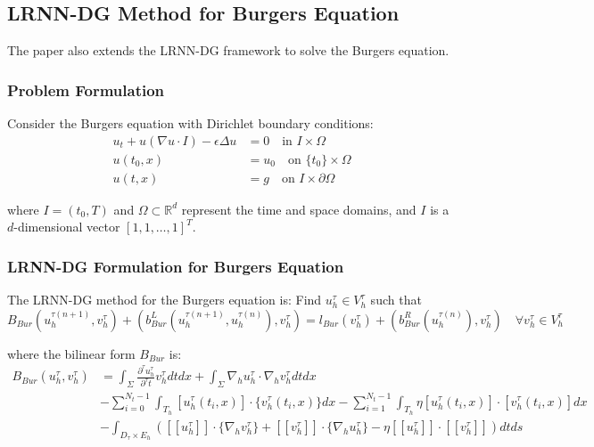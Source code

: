 \documentclass[11pt,a4paper]{article}
\begin{document}
\subsection{LRNN-DG Method for Burgers Equation}

The paper also extends the LRNN-DG framework to solve the Burgers equation.

\subsubsection{Problem Formulation}

Consider the Burgers equation with Dirichlet boundary conditions:
\begin{align}
u_t + u(\nabla u \cdot I) - \epsilon \Delta u &= 0 \quad \text{in } I \times \Omega \\
u(t_0, x) &= u_0 \quad \text{on } \{t_0\} \times \Omega \\
u(t, x) &= g \quad \text{on } I \times \partial\Omega
\end{align}

where $I = (t_0, T)$ and $\Omega \subset \mathbb{R}^d$ represent the time and space domains, and $I$ is a $d$-dimensional vector $[1,1,\ldots,1]^T$.

\subsubsection{LRNN-DG Formulation for Burgers Equation}

The LRNN-DG method for the Burgers equation is: Find $u_h^\tau \in V_h^\tau$ such that
\begin{equation}
B_{Bur}(u_h^{\tau(n+1)}, v_h^\tau) + \left(b_{Bur}^L(u_h^{\tau(n+1)}, u_h^{\tau(n)}), v_h^\tau\right) = l_{Bur}(v_h^\tau) + \left(b_{Bur}^R(u_h^{\tau(n)}), v_h^\tau\right) \quad \forall v_h^\tau \in V_h^\tau
\end{equation}

where the bilinear form $B_{Bur}$ is:
\begin{align}
B_{Bur}(u_h^\tau, v_h^\tau) &= \int_\Sigma \frac{\partial^\tau u_h^\tau}{\partial^\tau t} v_h^\tau dtdx + \int_\Sigma \nabla_h u_h^\tau \cdot \nabla_h v_h^\tau dtdx \\
&- \sum_{i=0}^{N_t-1} \int_{T_h} [u_h^\tau(t_i, x)] \cdot \{v_h^\tau(t_i, x)\} dx - \sum_{i=1}^{N_t-1} \int_{T_h} \eta [u_h^\tau(t_i, x)] \cdot [v_h^\tau(t_i, x)] dx \\
&- \int_{D_\tau \times E_h} ([\![u_h^\tau]\!] \cdot \{\nabla_h v_h^\tau\} + [\![v_h^\tau]\!] \cdot \{\nabla_h u_h^\tau\} - \eta [\![u_h^\tau]\!] \cdot [\![v_h^\tau]\!]) dtds
\end{align}
\end{document}

